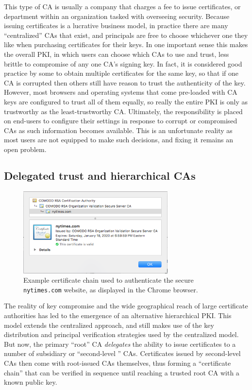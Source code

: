 \documentclass[11pt,twoside]{scrartcl}
\begin{document}
This type of CA is usually a company that charges a fee to issue certificates, or department within an organization tasked with overseeing security. Because issuing certificates is a lucrative business model, in practice there are many ``centralized'' CAs that exist, and principals are free to choose whichever one they like when purchasing certificates for their keys. In one important sense this makes the overall PKI, in which users can choose which CAs to use and trust, less brittle to compromise of any one CA's signing key. In fact, it is considered good practice by some to obtain multiple certificates for the same key, so that if one CA is corrupted then others still have reason to trust the authenticity of the key. However, most browsers and operating systems that come pre-loaded with CA keys are configured to trust all of them equally, so really the entire PKI is only as trustworthy as the least-trustworthy CA. Ultimately, the responsibility is placed on end-users to configure their settings in response to corrupt or compromised CAs as such information becomes available. This is an unfortunate reality as most users are not equipped to make such decisions, and fixing it remains an open problem.

\subsection{Delegated trust and hierarchical CAs}

\begin{figure}
\centering
\includegraphics[width=0.7\textwidth]{ca.png}
\caption{\label{fig:ca}Example certificate chain used to authenticate the secure \nolinkurl{nytimes.com} website, as displayed in the Chrome browser.}
\end{figure}

The reality of key compromise and the wide geographical reach of large certificate authorities has led to the emergence of an alternative hierarchical PKI. This model extends the centralized approach, and still makes use of the key distribution and principal verification strategies used by the centralized model. But now, the primary ``root'' CA \emph{delegates} the ability to issue certificates to a number of subsidiary or ``second-level '' CAs. Certificates issued by second-level CAs then come with root-issued CAs themselves, thus forming a ``certificate chain'' that can be verified in sequence until reaching a trusted root CA with a known public key. 
\end{document}
